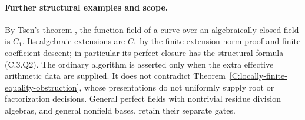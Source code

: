 \paragraph{Further structural examples and scope.}
By Tsen's theorem \cite[Theorem 59.67.10, Tag 03RD]{C-StacksC1Fields},
the function field of a curve over an algebraically closed field is
$C_1$. Its algebraic extensions are $C_1$ by the finite-extension
norm proof and finite coefficient descent; in particular its perfect
closure has the structural formula (C.3.Q2). The ordinary algorithm is
asserted only when the extra effective arithmetic data are supplied.
It does not contradict Theorem~\ref{C:locally-finite-equality-obstruction},
whose presentations do not uniformly supply root or factorization
decisions. General perfect fields with nontrivial residue division
algebras, and general nonfield bases, retain their separate gates.

